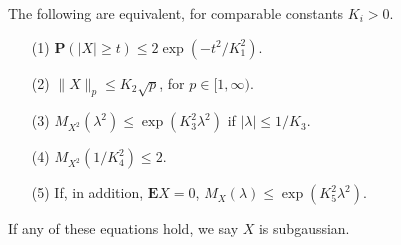 \begin{theorem}
    The following are equivalent, for comparable constants $K_i > 0$.
    \begin{enumerate}
        \item[(1)] $\mathbf{P}(|X| \geq t) \leq 2 \exp(-t^2/K_1^2)$.
        \item[(2)] $\| X \|_p \leq K_2 \sqrt{p}$, for $p \in [1,\infty)$.
        \item[(3)] $M_{X^2}(\lambda^2) \leq \exp(K_3^2 \lambda^2)$ if $|\lambda| \leq 1/K_3$.
        \item[(4)] $M_{X^2}(1/K_4^2) \leq 2$.
        \item[(5)] If, in addition, $\mathbf{E} X = 0$, $M_X(\lambda) \leq \exp(K_5^2 \lambda^2)$.
    \end{enumerate}
    If any of these equations hold, we say $X$ is subgaussian.
\end{theorem}
